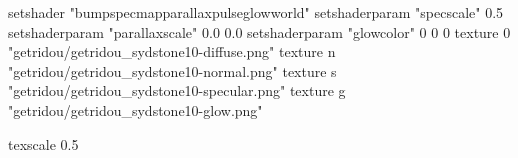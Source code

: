 setshader "bumpspecmapparallaxpulseglowworld"
setshaderparam "specscale" 0.5
setshaderparam "parallaxscale" 0.0 0.0
setshaderparam "glowcolor" 0 0 0
texture 0 "getridou/getridou_sydstone10-diffuse.png"
texture n "getridou/getridou_sydstone10-normal.png"
texture s "getridou/getridou_sydstone10-specular.png"
texture g "getridou/getridou_sydstone10-glow.png"

texscale 0.5